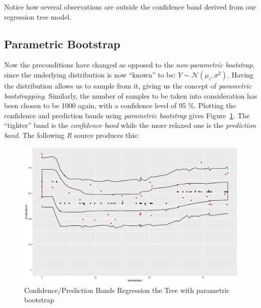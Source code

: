 \documentclass[a4paper,12pt]{article}
\begin{document}
        Notice how several observations are outside the confidence band derived from our regression tree model.

    \subsection*{Parametric Bootstrap}

        Now the preconditions have changed as opposed to the \emph{non-parametric bootstrap}, since the underlying distribution is now ``known'' to be: $Y \sim \mathcal{N}(\mu_i, \sigma^2)$. Having the distribution allows us to sample from it, giving us the concept of \emph{parametric bootstrapping}. Similarly, the number of samples to be taken into consideration has been chosen to be 1000 again, with a confidence level of 95 \%. Plotting the confidence and prediction bands using \emph{parametric bootstrap} gives Figure~\ref{fig:confpred_bands}. The ``tighter'' band is the \emph{confidence band} while the more relaxed one is the \emph{prediction band}. The following \emph{R} source produces this:
        

        

        

        

        \begin{figure}[H]
            \centering
            \caption{Confidence/Prediction Bands Regression the Tree with parametric bootstrap}
            \label{fig:confpred_bands}
            \includegraphics[width=\textwidth]{share/A1_parametric.eps}
        \end{figure}
\end{document}
